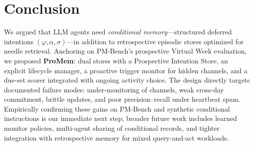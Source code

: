 \section{Conclusion}

We argued that LLM agents need \emph{conditional memory}---structured deferred intentions $(\varphi,\alpha,\sigma)$---in addition to retrospective episodic stores optimized for needle retrieval. Anchoring on PM-Bench's prospective Virtual Week evaluation, we proposed \textbf{ProMem}: dual stores with a Prospective Intention Store, an explicit lifecycle manager, a proactive trigger monitor for hidden channels, and a due-set scorer integrated with ongoing activity choice. The design directly targets documented failure modes: under-monitoring of channels, weak cross-day commitment, brittle updates, and poor precision--recall under heartbeat spam. Empirically confirming these gains on PM-Bench and synthetic conditional instructions is our immediate next step; broader future work includes learned monitor policies, multi-agent sharing of conditional records, and tighter integration with retrospective memory for mixed query-and-act workloads.
